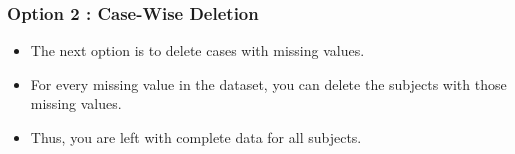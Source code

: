 \documentclass[MASTER.tex]{subfiles}
\begin{document}
%
%
	\begin{frame}
		\Large
		
		\frametitle{Option 2 : Case-Wise Deletion}
		\begin{itemize}
\item The next option is to delete cases with missing values.  
\item For every missing value in the dataset, you can delete the subjects with those missing values. 
\item Thus, you are left with complete data for all subjects.
		\end{itemize}
	
	\end{frame}
\end{document}
